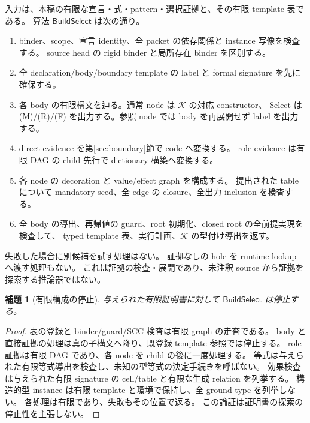 \documentclass[11pt,a4paper]{article}
\newtheorem{lemma}[definition]{補題}
\newcommand{\Core}{\mathcal K}
\begin{document}
入力は、本稿の有限な宣言・式・pattern・選択証拠と、その有限 template 表である。
算法 \(\mathsf{BuildSelect}\) は次の通り。
\begin{enumerate}
\item binder、scope、宣言 identity、全 packet の依存関係と instance 写像を検査する。
      source head の rigid binder と局所存在 binder を区別する。
\item 全 declaration/body/boundary template の label と formal signature を先に確保する。
\item 各 body の有限構文を辿る。通常 node は \(\Core\) の対応 constructor、
      Select は (M)/(R)/(F) を出力する。参照 node では body を再展開せず label を出力する。
\item direct evidence を第\ref{sec:boundary}節で code へ変換する。
      role evidence は有限 DAG の child 先行で dictionary 構築へ変換する。
\item 各 node の decoration と value/effect graph を構成する。
      提出された table について mandatory seed、全 edge の closure、全出力 inclusion を検査する。
\item 全 body の導出、再帰値の guard、root 初期化、closed root の全前提実現を検査して、
      typed template 表、実行計画、\(\Core\) の型付け導出を返す。
\end{enumerate}
失敗した場合に別候補を試す処理はない。
証拠なしの hole を runtime lookup へ渡す処理もない。
これは証拠の検査・展開であり、未注釈 source から証拠を探索する推論器ではない。

\begin{lemma}[有限構成の停止]
与えられた有限証明書に対して \(\mathsf{BuildSelect}\) は停止する。
\end{lemma}
\begin{proof}
表の登録と binder/guard/SCC 検査は有限 graph の走査である。
body と直接証拠の処理は真の子構文へ降り、既登録 template 参照では停止する。
role 証拠は有限 DAG であり、各 node を child の後に一度処理する。
等式は与えられた有限等式導出を検査し、未知の型等式の決定手続きを呼ばない。
効果検査は与えられた有限 signature の cell/table と有限な生成 relation を列挙する。
構造的型 instance は有限 template と環境で保持し、全 ground type を列挙しない。
各処理は有限であり、失敗もその位置で返る。
この論証は証明書の探索の停止性を主張しない。
\end{proof}
\end{document}
